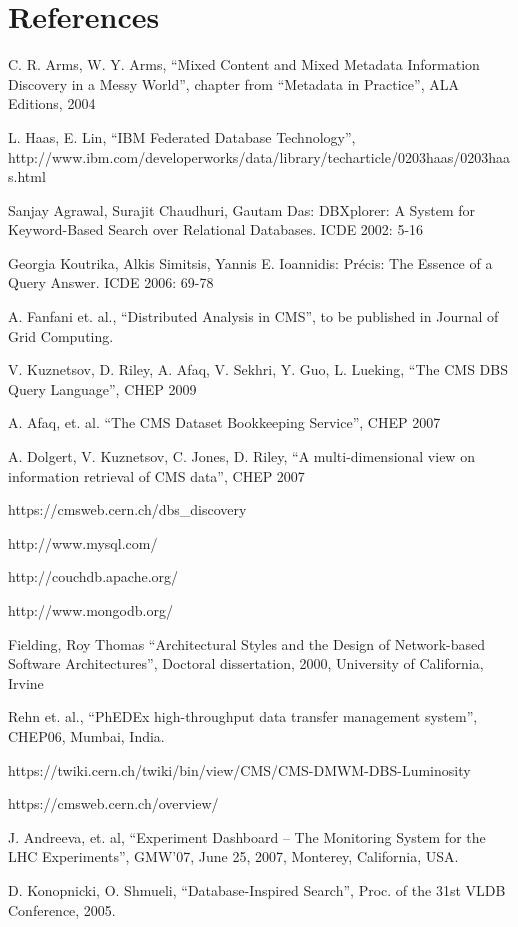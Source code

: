 \documentclass[a4paper]{jpconf}
\begin{document}
\section*{References}
\begin{thebibliography}{9}
C. R. Arms, W. Y. Arms, ``Mixed Content and Mixed Metadata 
Information Discovery in a Messy World'',
chapter from ``Metadata in Practice'', ALA Editions, 2004

L. Haas, E. Lin,
``IBM Federated Database Technology'', \\
http://www.ibm.com/developerworks/data/library/techarticle/0203haas/0203haas.html

Sanjay Agrawal, Surajit Chaudhuri, Gautam Das: DBXplorer: A System for
Keyword-Based Search over Relational Databases. ICDE 2002: 5-16

Georgia Koutrika, Alkis Simitsis, Yannis E. Ioannidis: Pr\'{e}cis: The Essence of
a Query Answer. ICDE 2006: 69-78

 A. Fanfani et. al.,
``Distributed Analysis in CMS'', to be published in Journal of Grid Computing.

 V. Kuznetsov, D. Riley, A. Afaq, V. Sekhri, Y. Guo, L. Lueking,
``The CMS DBS Query Language'', CHEP 2009

 A. Afaq, et. al. ``The CMS Dataset Bookkeeping Service'', CHEP 2007 

 A. Dolgert, V. Kuznetsov, C. Jones, D. Riley, 
``A multi-dimensional view on information retrieval of CMS data'', CHEP 2007

 https://cmsweb.cern.ch/dbs\_discovery

http://www.mysql.com/

http://couchdb.apache.org/

http://www.mongodb.org/

Fielding, Roy Thomas ``Architectural Styles and the Design of 
Network-based Software Architectures'', Doctoral dissertation, 2000,
University of California, Irvine

Rehn et. al.,
``PhEDEx high-throughput data transfer management system'', CHEP06, Mumbai, India.



https://twiki.cern.ch/twiki/bin/view/CMS/CMS-DMWM-DBS-Luminosity


https://cmsweb.cern.ch/overview/

J. Andreeva, et. al,
``Experiment Dashboard – The Monitoring System for the LHC Experiments'',
GMW’07, June 25, 2007, Monterey, California, USA.

D. Konopnicki, O. Shmueli,
``Database-Inspired Search'', 
Proc. of the 31st VLDB Conference, 2005.
\end{thebibliography}
\end{document}
